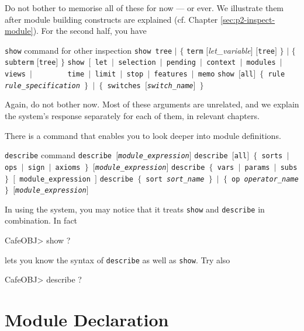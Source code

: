 \documentclass[a4paper]{memoir}
\begin{document}
Do not bother to memorise all of these for now --- or ever.
We illustrate them after module building constructs are
explained (cf. Chapter \ref{sec:p2-inspect-module}). For the second half,
you have

\begin{bsyntax} \texttt{show} command for other inspection \Hline
\texttt{show tree} $|$ $\{$ \texttt{term} $[$\textit{let\_variable}$]$ $[$\texttt{tree}$]$ $\}$ $|$ $\{$ \texttt{subterm} $[$\texttt{tree}$]$ $\}$
\texttt{show $[$ let $|$ selection $|$ pending $|$ context $|$ modules $|$ views $|$}
~~~~~~~~\texttt{time $|$ limit $|$ stop $|$ features $|$ memo}
\texttt{show $[$all$]$ $\{$ rule \textit{rule\_specification} $\}$ $|$ $\{$ switches $[$\textit{switch\_name}$]$ $\}$}
\end{bsyntax}

Again, do not bother now. Most of these arguments are unrelated, and
we explain the system's response separately for each of them,
in relevant chapters.

There is a command that enables
you to look deeper into module definitions.

\begin{bsyntax} \texttt{describe} command  \Hline
\texttt{describe $[$\textit{module\_expression}$]$}
\texttt{describe $[$all$]$ $\{$ sorts $|$ ops $|$ sign $|$ axioms $\}$ $[$\textit{module\_expression}$]$}
\texttt{describe $\{$ vars $|$ params $|$ subs $\}$ $[$\textit{} module\_expression $]$}
\texttt{describe $\{$ sort \textit{sort\_name} $\}$ $|$ $\{$ op \textit{operator\_name} $\}$ $[$\textit{module\_expression}$]$}
\end{bsyntax}

\begin{warning}
  In using the system, you may notice that it treats
  \verb|show| and \verb|describe| in combination. In fact
\begin{vvtm}
\begin{ccode}
  CafeOBJ> show ?
\end{ccode}
\end{vvtm}
  lets you know the syntax of \verb|describe| as well as \verb|show|.
  Try also
\begin{vvtm}
\begin{ccode}
  CafeOBJ> describe ?
\end{ccode}
\end{vvtm}
\end{warning}

\chapter{Module Declaration}\label{sec:p2-module-declaration}
\end{document}
